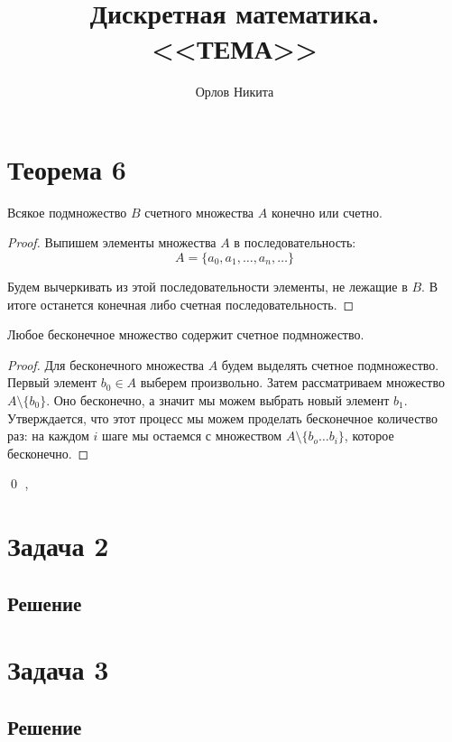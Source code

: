 \documentclass[a4paper,12pt]{article}
\begin{document}
	\title{Дискретная математика. <<ТЕМА>>}
	\author{Орлов Никита}
	\maketitle
	
	\section*{Теорема 6}
	\begin{theorem}
		Всякое подмножество $B$ счетного множества $A$ конечно или счетно.
	\end{theorem}
	\begin{proof}
		Выпишем элементы множества $A$ в последовательность:
		\[
		A = \{a_0, a_1, \ldots, a_n, \ldots \}
		\]
		
		Будем вычеркивать из этой последовательности элементы, не лежащие в $B$. В итоге останется конечная либо счетная последовательность. 
	\end{proof}

	\begin{theorem}
		Любое бесконечное множество содержит счетное подмножество.
	\end{theorem}
	\begin{proof}
		Для бесконечного множества $A$ будем выделять счетное подмножество. Первый элемент $b_0 \in A$ выберем произвольно. Затем рассматриваем множество $A \setminus \{b_0\}$. Оно бесконечно, а значит мы можем выбрать новый элемент $b_1$. Утверждается, что этот процесс мы можем проделать бесконечное количество раз: на каждом $i$ шаге мы остаемся с множеством $A \setminus \{b_o \ldots b_i\}$, которое бесконечно.
	\end{proof}
    
	\qed %
	\sep	
	
	
	\section*{Задача 2}
	
	\subsection*{Решение}
	
	\section*{Задача 3}
	
	
	\subsection*{Решение}
	
\end{document}
